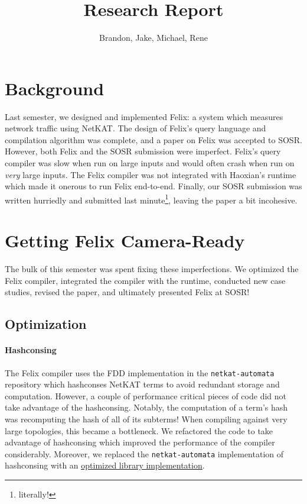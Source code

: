 \documentclass{hw}
\title{Research Report}
\author{Brandon, Jake, Michael, Rene}
\newcommand{\netauto}{\texttt{netkat-automata}}
\newcommand{\niceref}[2]{\underline{\textcolor{blue}{\href{#1}{#2}}}}
\begin{document}
\maketitle

\section{Background}
Last semester, we designed and implemented Felix: a system which measures
network traffic using NetKAT. The design of Felix's query language and
compilation algorithm was complete, and a paper on Felix was accepted to SOSR.
However, both Felix and the SOSR submission were imperfect. Felix's query
compiler was slow when run on large inputs and would often crash when run on
\emph{very} large inputs. The Felix compiler was not integrated with Haoxian's
runtime which made it onerous to run Felix end-to-end. Finally, our SOSR
submission was written hurriedly and submitted last
minute\footnote{literally!}, leaving the paper a bit incohesive.

\section{Getting Felix Camera-Ready}
The bulk of this semester was spent fixing these imperfections. We optimized
the Felix compiler, integrated the compiler with the runtime, conducted new
case studies, revised the paper, and ultimately presented Felix at SOSR!

\subsection{Optimization}
\paragraph{Hashconsing}
The Felix compiler uses the FDD implementation in the \netauto{} repository
which hashconses NetKAT terms to avoid redundant storage and computation.
However, a couple of performance critical pieces of code did not take advantage
of the hashconsing. Notably, the computation of a term's hash was recomputing
the hash of all of its subterms! When compiling against very large topologies,
this became a bottleneck. We refactored the code to take advantage of
hashconsing which improved the performance of the compiler considerably.
Moreover, we replaced the \netauto{} implementation of hashconsing with an
\niceref{https://github.com/backtracking/ocaml-hashcons}{optimized library
implementation}.
\end{document}
